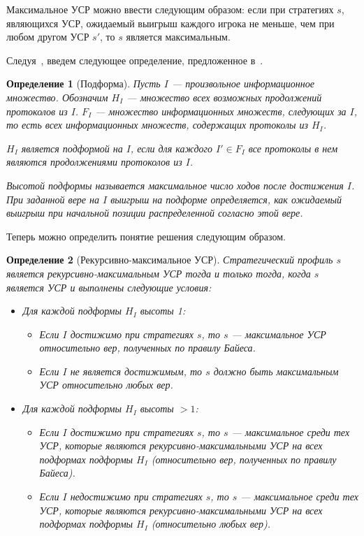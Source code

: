 \documentclass[14pt, a4paper]{extreport}
\newtheorem{definition}{\indent Определение}
\begin{document}
        Максимальное УСР можно ввести следующим образом: если при стратегиях $s$, являющихся УСР, ожидаемый выигрыш каждого игрока не меньше, чем при любом другом УСР $s'$, то $s$ является максимальным.

        Следуя~\cite{chen2017noncoop}, введем следующее определение, предложенное в~\cite{kreps1982sequential}.
        \begin{definition}[Подформа]
            Пусть $I$ --- произвольное информационное множество. Обозначим $H_I$ --- множество всех возможных продолжений протоколов из $I$. $F_I$ --- множество информационных множеств, следующих за $I$, то есть всех информационных множеств, содержащих протоколы из $H_I$.

            $H_I$ является подформой на $I$, если для каждого $I' \in F_I$ все протоколы в нем являются продолжениями протоколов из $I$.

            Высотой подформы называется максимальное число ходов после достижения $I$. При заданной вере на $I$ выигрыш на подформе определяется, как ожидаемый выигрыш при начальной позиции распределенной согласно этой вере.
        \end{definition}

        Теперь можно определить понятие решения следующим образом.

        \begin{definition}[Рекурсивно-максимальное УСР]
            Стратегический профиль $s$ является рекурсивно-максимальным УСР тогда и только тогда, когда $s$ является УСР и выполнены следующие условия:
            \begin{itemize}
                \item Для каждой подформы $H_I$ высоты 1:
                    \begin{itemize}
                        \item Если $I$ достижимо при стратегиях $s$, то $s$ --- максимальное УСР относительно вер, полученных по правилу Байеса.
                        \item Если $I$ не является достижимым, то $s$ должно быть максимальным УСР относительно любых вер.
                    \end{itemize}
                \item Для каждой подформы $H_I$ высоты $>1$:
                    \begin{itemize}
                        \item Если $I$ достижимо при стратегиях $s$, то $s$ --- максимальное среди тех УСР, которые являются рекурсивно-максимальными УСР на всех подформах подформы $H_I$ (относительно вер, полученных по правилу Байеса).
                        \item Если $I$ недостижимо при стратегиях $s$, то $s$ --- максимальное среди тех УСР, которые являются рекурсивно-максимальными УСР на всех подформах подформы $H_I$ (относительно любых вер).
                    \end{itemize}
            \end{itemize}
        \end{definition}
\end{document}
